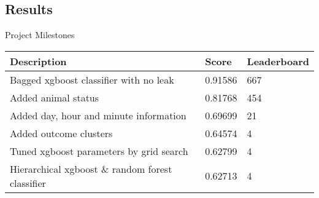 \subsection{Results}

\begin{frame}[c]{Project Milestones}
	\begin{table}[t]
		\centering
		\begin{tabular}{@{}lll@{}}
		\toprule
		Description                                      & Score   & Leaderboard \\ \midrule
		Bagged xgboost classifier with no leak           & 0.91586 & 667         \\
		Added animal status                              & 0.81768 & 454         \\
		Added day, hour and minute information           & 0.69699 & 21          \\
		Added outcome clusters                           & 0.64574 & 4           \\
		Tuned xgboost parameters by grid search          & 0.62799 & 4           \\
		Hierarchical xgboost \& random forest classifier & 0.62713 & 4           \\ \bottomrule
		\end{tabular}
	\end{table}

\end{frame}
